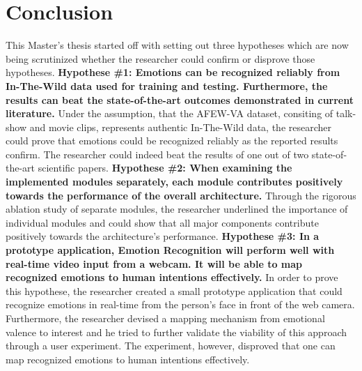 
\chapter{Conclusion}
This Master's thesis started off with setting out three hypotheses which are now being scrutinized whether the researcher could confirm or disprove those hypotheses.\newline\newline
\textbf{Hypothese \#1: Emotions can be recognized reliably from In-The-Wild data used for training and testing. Furthermore, the results can beat the state-of-the-art outcomes demonstrated in current literature.}\newline
Under the assumption, that the AFEW-VA dataset, consiting of talk-show and movie clips, represents authentic In-The-Wild data, the researcher could prove that emotions could be recognized reliably as the reported results confirm. The researcher could indeed beat the results of one out of two state-of-the-art scientific papers.
\newline\newline
\textbf{Hypothese \#2: When examining the implemented modules separately, each module contributes positively towards the performance of the overall architecture.}\newline
Through the rigorous ablation study of separate modules, the researcher underlined the importance of individual modules and could show that all major components contribute positively towards the architecture's performance.
\newline\newline
\textbf{Hypothese \#3: In a prototype application, Emotion Recognition will perform well with real-time video input from a webcam. It will be able to map recognized emotions to human intentions effectively.}\newline
In order to prove this hypothese, the researcher created a small prototype application that could recognize emotions in real-time from the person's face in front of the web camera. Furthermore, the researcher devised a mapping mechanism from emotional valence to interest and he tried to further validate the viability of this approach through a user experiment. The experiment, however, disproved that one can map recognized emotions to human intentions effectively.



